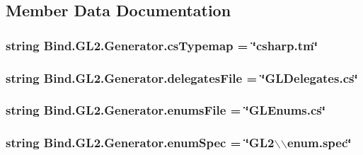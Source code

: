 \subsection{Member Data Documentation}
\hypertarget{class_bind_1_1_g_l2_1_1_generator_ab5499e9adc2a5fd054e28a525aa1adbf}{
\subsubsection[{csTypemap}]{\setlength{\rightskip}{0pt plus 5cm}string {\bf Bind.GL2.Generator.csTypemap} = \char`\"{}csharp.tm\char`\"{}}}
\label{class_bind_1_1_g_l2_1_1_generator_ab5499e9adc2a5fd054e28a525aa1adbf}
\hypertarget{class_bind_1_1_g_l2_1_1_generator_a5b350f970dd33df9ecf5d1c3264fc095}{
\subsubsection[{delegatesFile}]{\setlength{\rightskip}{0pt plus 5cm}string {\bf Bind.GL2.Generator.delegatesFile} = \char`\"{}GLDelegates.cs\char`\"{}}}
\label{class_bind_1_1_g_l2_1_1_generator_a5b350f970dd33df9ecf5d1c3264fc095}
\hypertarget{class_bind_1_1_g_l2_1_1_generator_a081cd925878beb9277482b1a5b5151ae}{
\subsubsection[{enumsFile}]{\setlength{\rightskip}{0pt plus 5cm}string {\bf Bind.GL2.Generator.enumsFile} = \char`\"{}GLEnums.cs\char`\"{}}}
\label{class_bind_1_1_g_l2_1_1_generator_a081cd925878beb9277482b1a5b5151ae}
\hypertarget{class_bind_1_1_g_l2_1_1_generator_a164592b7b73705b19e193171ad8276db}{
\subsubsection[{enumSpec}]{\setlength{\rightskip}{0pt plus 5cm}string {\bf Bind.GL2.Generator.enumSpec} = \char`\"{}GL2$\backslash$$\backslash$enum.spec\char`\"{}}}
